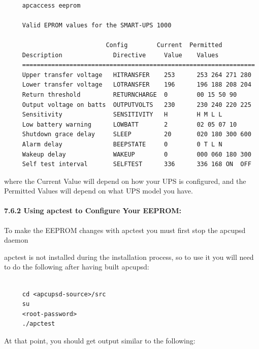 \footnotesize
\begin{verbatim}
     
     apcaccess eeprom
     
     Valid EPROM values for the SMART-UPS 1000
     
                            Config        Current  Permitted
     Description              Directive     Value    Values
     ================================================================
     Upper transfer voltage   HITRANSFER    253      253 264 271 280
     Lower transfer voltage   LOTRANSFER    196      196 188 208 204
     Return threshold         RETURNCHARGE  0        00 15 50 90
     Output voltage on batts  OUTPUTVOLTS   230      230 240 220 225
     Sensitivity              SENSITIVITY   H        H M L L
     Low battery warning      LOWBATT       2        02 05 07 10
     Shutdown grace delay     SLEEP         20       020 180 300 600
     Alarm delay              BEEPSTATE     0        0 T L N
     Wakeup delay             WAKEUP        0        000 060 180 300
     Self test interval       SELFTEST      336      336 168 ON  OFF
\end{verbatim}
\normalsize

where the Current Value will depend on how your UPS is configured, and the
Permitted Values will depend on what UPS model you have. 

\label{Using-apctest-to-Configure-Your-EEPROM}

\paragraph*{7.6.2 Using apctest to Configure Your EEPROM:}

\label{index-eeprom_002c-apctest-142}
\label{index-apctest-setting-eeprom-143}
To make the EEPROM changes with apctest you must first stop the apcupsd daemon
 

apctest is not installed during the installation process, so to use it you
will need to do the following after having built apcupsd: 

\footnotesize
\begin{verbatim}
     
     cd <apcupsd-source>/src
     su
     <root-password>
     ./apctest
\end{verbatim}
\normalsize

At that point, you should get output similar to the following: 

